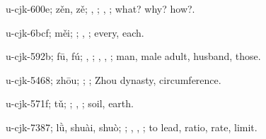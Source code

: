 \begin{multicols}{2}
{\cjkgGlue{}u-cjk-600e; zěn, zě; \cjkgGlue{}, \cjkgGlue{}; \cjkgGlue{}, \cjkgGlue{}; what? why? how?.

\cjkgGlue{}u-cjk-6bcf; měi; \cjkgGlue{}; \cjkgGlue{}, \cjkgGlue{}; every, each.

\cjkgGlue{}u-cjk-592b; fū, fú; \cjkgGlue{}, \cjkgGlue{}\cjkgGlue{}\cjkgGlue{}; \cjkgGlue{}, \cjkgGlue{}, \cjkgGlue{}; man, male adult, husband, those.

\cjkgGlue{}u-cjk-5468; zhōu; \cjkgGlue{}\cjkgGlue{}\cjkgGlue{}; \cjkgGlue{}; Zhou dynasty, circumference.

\cjkgGlue{}u-cjk-571f; tǔ; \cjkgGlue{}; \cjkgGlue{}, \cjkgGlue{}; soil, earth.

\cjkgGlue{}u-cjk-7387; lǜ, shuài, shuò; \cjkgGlue{}\cjkgGlue{}\cjkgGlue{}; \cjkgGlue{}, \cjkgGlue{}, \cjkgGlue{}; to lead, ratio, rate, limit.

}
\end{multicols}
